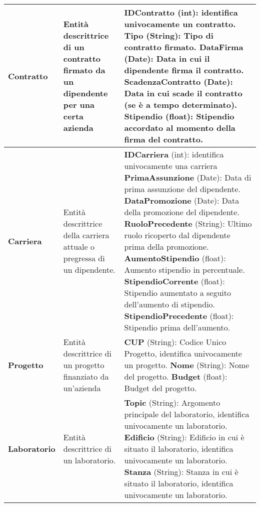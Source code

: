 \begin{xltabular}{\textwidth}{l X X}
        \textbf{Contratto} & Entità descrittrice di un contratto firmato da un dipendente per una certa azienda & \textbf{IDContratto} (int): identifica univocamente un contratto.
        \newline\textbf{Tipo} (String): Tipo di contratto firmato.
        \newline\textbf{DataFirma} (Date): Data in cui il dipendente firma il contratto.
        \newline\textbf{ScadenzaContratto} (Date): Data in cui scade il contratto (se è a tempo determinato).
        \newline\textbf{Stipendio} (float): Stipendio accordato al momento della firma del contratto.\\
        \hline
        \textbf{Carriera} & Entità descrittrice della carriera attuale o pregressa di un dipendente. &  \textbf{IDCarriera} (int): identifica univocamente una carriera
        \newline\textbf{PrimaAssunzione} (Date): Data di prima assunzione del dipendente.
        \newline\textbf{DataPromozione} (Date): Data della promozione del dipendente.
        \newline\textbf{RuoloPrecedente} (String): Ultimo ruolo ricoperto dal dipendente prima della promozione.
        \newline\textbf{AumentoStipendio} (float): Aumento stipendio in percentuale.
        \newline\textbf{StipendioCorrente} (float): Stipendio aumentato a seguito dell'aumento di stipendio. 
        \newline\textbf{StipendioPrecedente} (float): Stipendio prima dell'aumento. \\
        \hline

        \textbf{Progetto} & Entità descrittrice di un progetto finanziato da un'azienda & \textbf{CUP} (String): Codice Unico Progetto, identifica univocamente un progetto. 
        \newline\textbf{Nome} (String): Nome del progetto. 
        \newline\textbf{Budget} (float): Budget del progetto. \\
        \hline

        \textbf{Laboratorio} & Entità descrittrice di un laboratorio. & \textbf{Topic} (String): Argomento principale del laboratorio, identifica univocamente un laboratorio.
        \newline\textbf{Edificio} (String): Edificio in cui è situato il laboratorio, identifica univocamente un laboratorio. 
        \newline\textbf{Stanza} (String): Stanza in cui è situato il laboratorio, identifica univocamente un laboratorio. \\

    \end{xltabular}
\endgroup

